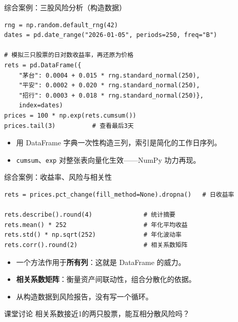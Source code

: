\documentclass[9pt]{ctexbeamer}
\begin{document}
\begin{frame}[fragile]{综合案例：三股风险分析（构造数据）}
	\begin{lstlisting}
rng = np.random.default_rng(42)
dates = pd.date_range("2026-01-05", periods=250, freq="B")

# 模拟三只股票的日对数收益率，再还原为价格
rets = pd.DataFrame({
    "茅台": 0.0004 + 0.015 * rng.standard_normal(250),
    "平安": 0.0002 + 0.020 * rng.standard_normal(250),
    "招行": 0.0003 + 0.018 * rng.standard_normal(250)},
    index=dates)
prices = 100 * np.exp(rets.cumsum())
prices.tail(3)          # 查看最后3天
\end{lstlisting}
	\begin{itemize}
		\item 用 DataFrame 字典一次性构造三列，索引是简化的工作日序列。
		\item \texttt{cumsum}、\texttt{exp} 对整张表向量化生效——NumPy 功力再现。
	\end{itemize}
\end{frame}

\begin{frame}[fragile]{综合案例：收益率、风险与相关性}
	\begin{lstlisting}
rets = prices.pct_change(fill_method=None).dropna()   # 日收益率

rets.describe().round(4)              # 统计摘要
rets.mean() * 252                     # 年化平均收益
rets.std() * np.sqrt(252)             # 年化波动率
rets.corr().round(2)                  # 相关系数矩阵
\end{lstlisting}
	\begin{itemize}
		\item 一个方法作用于\textbf{所有列}：这就是 DataFrame 的威力。
		\item \textbf{相关系数矩阵}：衡量资产间联动性，组合分散化的依据。
		\item 从构造数据到风险报告，没有写一个循环。
	\end{itemize}
	\begin{exampleblock}{课堂讨论}
		相关系数接近1的两只股票，能互相分散风险吗？
	\end{exampleblock}
\end{frame}
\end{document}
